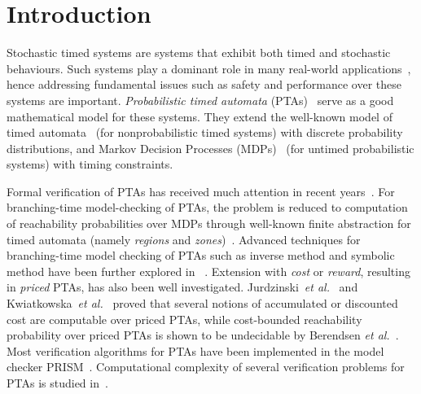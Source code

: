 \section{Introduction}
Stochastic timed systems are systems that exhibit both timed and stochastic behaviours.
Such systems play a dominant role in many real-world applications~\cite{DBLP:books/daglib/0020348}, hence
addressing fundamental issues such as safety and performance over these systems are important.
\emph{Probabilistic timed automata} (PTAs)~\cite{DBLP:journals/fmsd/NormanPS13,DBLP:journals/tcs/Beauquier03,DBLP:journals/tcs/KwiatkowskaNSS02} serve as a good mathematical model for these systems.
They extend the well-known model of timed automata~\cite{DBLP:journals/tcs/AlurD94} (for nonprobabilistic timed systems) with discrete probability distributions, and Markov Decision Processes (MDPs)~\cite{PutermanMDP} (for untimed probabilistic systems) with timing constraints.

Formal verification of PTAs has received much attention in recent years~\cite{DBLP:journals/fmsd/NormanPS13}.
For branching-time model-checking of PTAs, the problem is reduced to computation of reachability probabilities over MDPs through well-known finite abstraction for timed automata (namely \emph{regions} and \emph{zones})~\cite{JensenPTA,DBLP:journals/tcs/Beauquier03,DBLP:journals/tcs/KwiatkowskaNSS02}.
Advanced techniques for branching-time model checking of PTAs such as inverse method and symbolic method have been further explored in  ~\cite{DBLP:journals/fmsd/AndreFS13,DBLP:journals/iandc/KwiatkowskaNSW07,DBLP:conf/formats/KwiatkowskaNP09,DBLP:conf/formats/JovanovicKN15}.
Extension with \emph{cost} or \emph{reward}, resulting in \emph{priced} PTAs, has also been well investigated.
Jurdzinski~\emph{et al.}~\cite{DBLP:conf/concur/JurdzinskiKNT09} and Kwiatkowska~\emph{et al.}~\cite{DBLP:journals/fmsd/KwiatkowskaNPS06} proved that several notions of accumulated or discounted cost are computable over priced PTAs, while 
cost-bounded reachability probability over priced PTAs is shown to be undecidable by Berendsen \emph{et al.}~\cite{DBLP:conf/tamc/BerendsenCJ09}.
Most verification algorithms for PTAs have been implemented in the model checker PRISM~\cite{DBLP:conf/cav/KwiatkowskaNP11}. Computational complexity of several verification problems for PTAs is studied in~\cite{DBLP:journals/ipl/LaroussinieS07,DBLP:journals/lmcs/JurdzinskiSL08,DBLP:conf/concur/JurdzinskiKNT09}.

